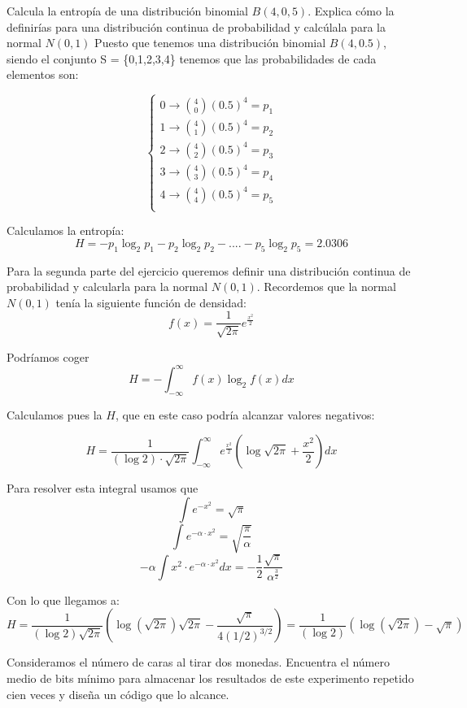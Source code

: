 \begin{problem}[4]
	Calcula la entropía de una distribución binomial $B(4,0,5)$. Explica cómo la definirías para una distribución continua de probabilidad y calcúlala para la normal $N(0,1)$
	\solution
	Puesto que tenemos una distribución binomial $B (4, 0.5)$, siendo el conjunto S = \{0,1,2,3,4\} tenemos que las probabilidades de cada elementos son:

	\[\begin{cases}
	0 \rightarrow {4 \choose 0} (0.5)^4 = p_1 \\
	1 \rightarrow {4 \choose 1} (0.5)^4 = p_2 \\
	2 \rightarrow {4 \choose 2} (0.5)^4 = p_3 \\
	3 \rightarrow {4 \choose 3} (0.5)^4 = p_4 \\
	4 \rightarrow {4 \choose 4} (0.5)^4 = p_5 \\
	\end{cases}\]

	Calculamos la entropía:
	$$H = -p_1 \log_2 p_1 -p_2 \log_2 p_2 - ....  -p_5 \log_2 p_5 = 2.0306 $$

	Para la segunda parte del ejercicio queremos definir una distribución continua de probabilidad y calcularla para la normal $N(0,1)$. Recordemos que la normal $N(0,1)$ tenía la siguiente función de densidad:
	$$f(x) = \frac{1}{\sqrt{2\pi}} e^{\frac{x^2}{2}}$$

	Podríamos coger
	$$H = -\int_{-\infty}^{\infty} f(x) \log_2 f(x) dx$$

	Calculamos pues la $H$, que en este caso podría alcanzar valores negativos:

	$$H = \frac{1}{(\log 2) \cdot \sqrt{2\pi}} \int_{-\infty}^{\infty} e^{\frac{x^2}{2}} \left(\log \sqrt{2\pi} + \frac{x^2}{2}\right) dx$$

	Para resolver esta integral usamos que
	$$\int e^{-x^2} = \sqrt{\pi}$$
	$$\int e^{-\alpha \cdot x^2} = \sqrt{\frac{\pi}{\alpha}}$$
	$$- \alpha\int x^2\cdot  e^{-\alpha \cdot x^2} dx = -\frac{1}{2}\frac{\sqrt{\pi}}{\alpha^{\frac{3}{2}}}$$

	Con lo que llegamos a:
	\[H = \frac{1}{(\log 2)\sqrt{2π}}\left(\log(\sqrt{2π})\sqrt{2π} -\frac{\sqrt{π}}{4(1/2)^{3/2}}\right)=\frac{1}{(\log 2)}\left(\log(\sqrt{2π}) -\sqrt{π}\right)\]
\end{problem}

\begin{problem}[5]
Consideramos el número de caras al tirar dos monedas. Encuentra el número medio de bits mínimo para almacenar los resultados de este experimento repetido cien veces y diseña un código que lo alcance.
\solution
\end{problem}

